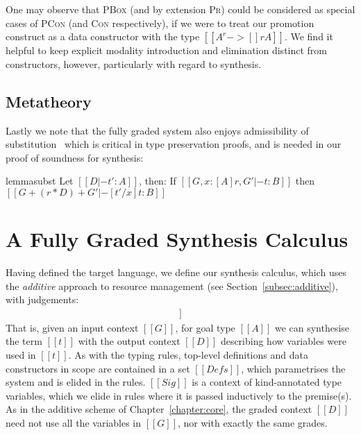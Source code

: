One may observe that \textsc{PBox} (and by extension \textsc{Pr}) could be
considered as special cases of \textsc{PCon} (and \textsc{Con} respectively), if
we were to treat our promotion construct as a data constructor with the type $[[
A ^ r -> {[] r A} ]]$. We find it helpful to keep explicit modality introduction
and elimination distinct from constructors, however, particularly with regard to
synthesis.

\subsection{Metatheory}
Lastly we note that the fully graded system also enjoys admissibility of
substitution~\citep{DBLP:journals/pacmpl/AbelB20, tale-of-two-calculi}
which is critical in type preservation proofs,
and is needed in our proof of soundness for synthesis:
%
\begin{restatable}{lemma}{subst}
\label{lemma:substitution}
Let $[[ D |- t' : A]]$, then:
If $[[ {G, x : [A] r} , G' |- t : B]]$
then $[[ G + (r * D) + G' |- [ t' / x ] t : B ]]$
\end{restatable}


\section{A Fully Graded Synthesis Calculus}
\label{section:graded-base-synthesis}

Having defined the target language, we define our synthesis calculus, which uses
the \emph{additive} approach to resource management (see
Section~\ref{subsec:additive}), with judgements:
%
\begin{align*}
[[ Sig; G |- A =>+ t ; D ]]
\end{align*}
%
That is, given an input context $[[ G ]]$, for goal type $[[ A ]]$ we can
synthesise the term $[[ t ]]$ with the output context $[[ D ]]$ describing how
variables were used in $[[ t ]]$. As with the typing rules, top-level
definitions and data constructors in scope are contained in a set $[[ Defs ]]$,
which parametrises the system and is elided in the rules. $[[ Sig ]]$ is a
context of kind-annotated type variables, which we elide in rules where it is
passed inductively to the premise(s). As in the additive scheme of
Chapter~\ref{chapter:core}, the graded context $[[ D ]]$ need not use all the
variables in $[[ G ]]$, nor with exactly the same grades. 

